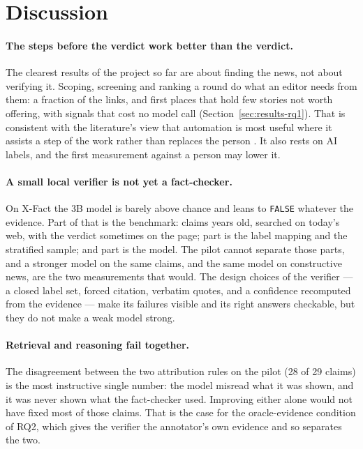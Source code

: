 
\section{Discussion}
\label{sec:discussion}

\paragraph{The steps before the verdict work better than the verdict.}
The clearest results of the project so far are about finding the news,
not about verifying it. Scoping, screening and ranking a round do what
an editor needs from them: a fraction of the links, and first places
that hold few stories not worth offering, with signals that cost no
model call (Section~\ref{sec:results-rq1}). That is consistent with the
literature's view that automation is most useful where it assists a
step of the work rather than replaces the person
\cite{nakov2021assisting}. It also rests on AI labels, and the first
measurement against a person may lower it.

\paragraph{A small local verifier is not yet a fact-checker.} On
X-Fact the 3B model is barely above chance and leans to \texttt{FALSE}
whatever the evidence. Part of that is the benchmark: claims years old,
searched on today's web, with the verdict sometimes on the page; part
is the label mapping and the stratified sample; and part is the model.
The pilot cannot separate those parts, and a stronger model on the same
claims, and the same model on constructive news, are the two
measurements that would. The design choices of the verifier --- a
closed label set, forced citation, verbatim quotes, and a confidence
recomputed from the evidence --- make its failures visible and its
right answers checkable, but they do not make a weak model strong.

\paragraph{Retrieval and reasoning fail together.} The disagreement
between the two attribution rules on the pilot (28 of 29 claims) is the
most instructive single number: the model misread what it was shown,
and it was never shown what the fact-checker used. Improving either
alone would not have fixed most of those claims. That is the case for
the oracle-evidence condition of RQ2, which gives the verifier the
annotator's own evidence and so separates the two.

